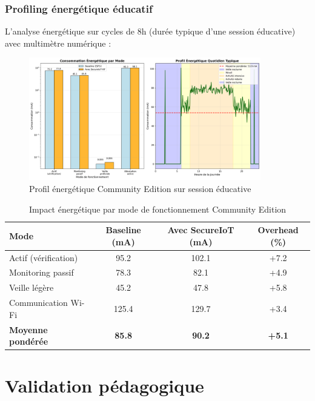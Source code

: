 \subsubsection{Profiling énergétique éducatif}

L'analyse énergétique sur cycles de 8h (durée typique d'une session éducative) avec multimètre numérique :

\begin{figure}[h]
    \centering
    \includegraphics[width=0.9\textwidth]{assets/figures/energy_profile_esp32.png}
    \caption{Profil énergétique Community Edition sur session éducative}
    \label{fig:energy-profile-community}
\end{figure}

\begin{table}[h]
\centering
\caption{Impact énergétique par mode de fonctionnement Community Edition}
\label{tab:energy-impact-community}
\begin{tabular}{|l|c|c|c|}
\hline
\textbf{Mode} & \textbf{Baseline (mA)} & \textbf{Avec SecureIoT (mA)} & \textbf{Overhead (\%)} \\
\hline
Actif (vérification) & 95.2 & 102.1 & +7.2 \\
Monitoring passif & 78.3 & 82.1 & +4.9 \\
Veille légère & 45.2 & 47.8 & +5.8 \\
Communication Wi-Fi & 125.4 & 129.7 & +3.4 \\
\hline
\textbf{Moyenne pondérée} & \textbf{85.8} & \textbf{90.2} & \textbf{+5.1} \\
\hline
\end{tabular}
\end{table}

\section{Validation pédagogique}

